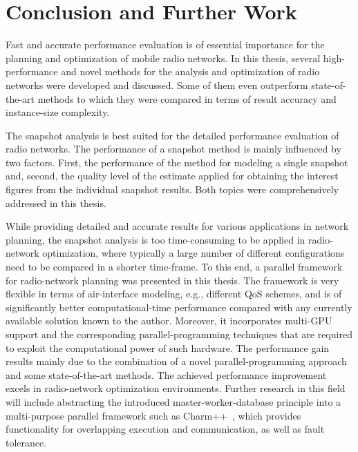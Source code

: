 
\chapter{Conclusion and Further Work \label{chap:Conclusion}}

Fast and accurate performance evaluation is of essential importance
for the planning and optimization of mobile radio networks. In this
thesis, several high-performance and novel methods for the analysis
and optimization of radio networks were developed and discussed. Some
of them even outperform state-of-the-art methods to which they were
compared in terms of result accuracy and instance-size complexity.

The snapshot analysis is best suited for the detailed performance
evaluation of radio networks. The performance of a snapshot method
is mainly influenced by two factors. First, the performance of the
method for modeling a single snapshot and, second, the quality level
of the estimate applied for obtaining the interest figures from the
individual snapshot results. Both topics were comprehensively addressed
in this thesis.

While providing detailed and accurate results for various applications
in network planning, the snapshot analysis is too time-consuming to
be applied in radio-network optimization, where typically a large
number of different configurations need to be compared in a shorter
time-frame. To this end, a parallel framework for radio-network planning
was presented in this thesis. The framework is very flexible in terms
of air-interface modeling, e.g., different QoS schemes, and is of
significantly better computational-time performance compared with
any currently available solution known to the author. Moreover, it
incorporates multi-GPU support and the corresponding parallel-programming
techniques that are required to exploit the computational power of
such hardware. The performance gain results mainly due to the combination
of a novel parallel-programming approach and some state-of-the-art
methods. The achieved performance improvement excels in radio-network
optimization environments. Further research in this field will include
abstracting the introduced master-worker-database principle into a
multi-purpose parallel framework such as Charm++~\cite{Kale-The_Charm_Approach:2013},
which provides functionality for overlapping execution and communication,
as well as fault tolerance.

